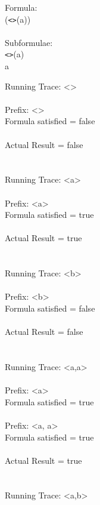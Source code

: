 Formula:\\
(\texttt{\textless \textgreater}(a))\\
\\
Subformulae:\\
\texttt{\textless \textgreater}(a)\\
a\\

\newpage

\noindent Running Trace: \textless \textgreater\\
\\
  Prefix: \textless \textgreater\\
  Formula satisfied = false\\
\\
  Actual Result = false\\
\\
\\
Running Trace: \textless a\textgreater\\
\\
  Prefix: \textless a\textgreater\\
  Formula satisfied = true\\
\\
  Actual Result = true\\
\\
\\
Running Trace: \textless b\textgreater\\
\\
  Prefix: \textless b\textgreater\\
  Formula satisfied = false\\
\\
  Actual Result = false\\
\\
\\
Running Trace: \textless a,a\textgreater\\
\\
  Prefix: \textless a\textgreater\\
  Formula satisfied = true\\
\\
  Prefix: \textless a, a\textgreater\\
  Formula satisfied = true\\
\\
  Actual Result = true\\
\\
\\
Running Trace: \textless a,b\textgreater\\
\\
